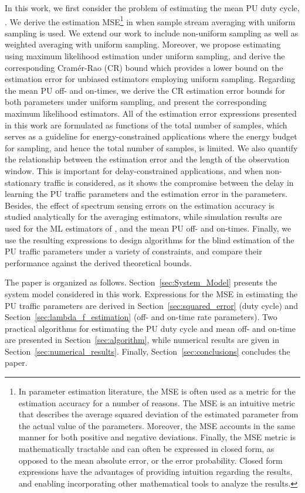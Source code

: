 \documentclass[11pt,draftclsnofoot,journal,onecolumn]{IEEEtran}
\begin{document}
In this work, we first consider the problem of estimating the mean PU duty cycle, . We derive the estimation MSE\footnote{In parameter estimation literature, the MSE is often used as a metric for the estimation accuracy for a number of reasons. The MSE is an intuitive metric that describes the average squared deviation of the estimated parameter from the actual value of the parameters. Moreover, the MSE accounts in the same manner for both positive and negative deviations. Finally, the MSE metric is mathematically tractable and can often be expressed in closed form, as opposed to the mean absolute error, or the error probability. Closed form expressions have the advantages of providing intuition regarding the results, and enabling incorporating other mathematical tools to analyze the results.} in  when sample stream averaging with uniform sampling is used. We extend our work to include non-uniform sampling as well as weighted averaging with uniform sampling. Moreover, we propose estimating  using maximum likelihood estimation under uniform sampling, and derive the corresponding Cram\'{e}r-Rao (CR) bound which provides a lower bound on the estimation error for unbiased estimators employing uniform sampling. Regarding the mean PU off- and on-times, we derive the CR estimation error bounds for both parameters under uniform sampling, and present the corresponding maximum likelihood estimators. All of the estimation error expressions presented in this work are formulated as functions of the total number of samples, which serves as a guideline for energy-constrained applications where the energy budget for sampling, and hence the total number of samples, is limited. We also quantify the relationship between the estimation error and the length of the observation window. This is important for delay-constrained applications, and when non-stationary traffic is considered, as it shows the compromise between the delay in learning the PU traffic parameters and the estimation error in the parameters. Besides, the effect of spectrum sensing errors on the estimation accuracy is studied analytically for the averaging estimators, while simulation results are used for the ML estimators of , and the mean PU off- and on-times. Finally, we use the resulting expressions to design algorithms for the blind estimation of the PU traffic parameters under a variety of constraints, and compare their performance against the derived theoretical bounds.

The paper is organized as follows. Section~\ref{sec:System_Model} presents the system model considered in this work. Expressions for the MSE in estimating the PU traffic parameters are derived in Section~\ref{sec:squared_error} (duty cycle) and Section~\ref{sec:lambda_f_estimation} (off- and on-time rate parameters). Two practical algorithms for estimating the PU duty cycle and mean off- and on-time are presented in Section~\ref{sec:algorithm}, while numerical results are given in Section~\ref{sec:numerical_results}. Finally, Section~\ref{sec:conclusions} concludes the paper.
\end{document}
